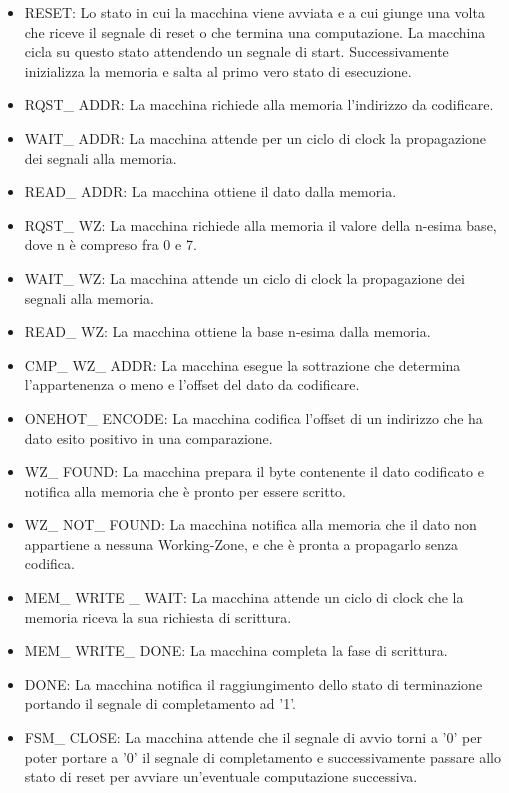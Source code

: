 \documentclass{article}
\begin{document}
\begin{itemize}

\item RESET: Lo stato in cui la macchina viene avviata e a cui giunge una volta che riceve il segnale di reset o che termina una computazione. La macchina cicla su questo stato attendendo un segnale di start. Successivamente inizializza la memoria e salta al primo vero stato di esecuzione.

\item RQST\_ ADDR: La macchina richiede alla memoria l'indirizzo da codificare.

\item WAIT\_ ADDR: La macchina attende per un ciclo di clock la propagazione dei segnali alla memoria.

\item READ\_ ADDR: La macchina ottiene il dato dalla memoria.

\item RQST\_ WZ: La macchina richiede alla memoria il valore della n-esima base, dove n è compreso fra 0 e 7.

\item WAIT\_ WZ: La macchina attende un ciclo di clock la propagazione dei segnali alla memoria.

\item READ\_ WZ: La macchina ottiene la base n-esima dalla memoria.

\item CMP\_ WZ\_ ADDR: La macchina esegue la sottrazione che determina l'appartenenza o meno e l'offset del dato da codificare.

\item ONEHOT\_ ENCODE: La macchina codifica l'offset di un indirizzo che ha dato esito positivo in una comparazione.

\item WZ\_ FOUND: La macchina prepara il byte contenente il dato codificato e notifica alla memoria che è pronto per essere scritto.

\item WZ\_ NOT\_ FOUND: La macchina notifica alla memoria che il dato non appartiene a nessuna Working-Zone, e che è pronta a propagarlo senza codifica.

\item MEM\_ WRITE \_ WAIT: La macchina attende un ciclo di clock che la memoria riceva la sua richiesta di scrittura.

\item MEM\_ WRITE\_ DONE: La macchina completa la fase di scrittura.

\item DONE: La macchina notifica il raggiungimento dello stato di terminazione portando il segnale di completamento ad '1'.

\item FSM\_ CLOSE: La macchina attende che il segnale di avvio torni a '0' per poter portare a '0' il segnale di completamento e successivamente passare allo stato di reset per avviare un'eventuale computazione successiva.

\end{itemize}
\end{document}
